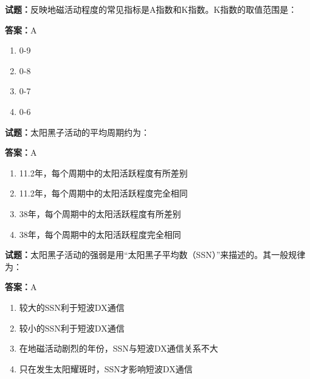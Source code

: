 \documentclass{ctexbook}
\begin{document}




\vspace{1em}

\textbf{试题：}反映地磁活动程度的常见指标是A指数和K指数。K指数的取值范围是： 

\textbf{答案：}A 

\begin{enumerate}[leftmargin=3em]
  \item 0-9 

  \item 0-8 

  \item 0-7 

  \item 0-6 

\end{enumerate}





\vspace{1em}

\textbf{试题：}太阳黑子活动的平均周期约为： 

\textbf{答案：}A 

\begin{enumerate}[leftmargin=3em]
  \item 11.2年，每个周期中的太阳活跃程度有所差别 

  \item 11.2年，每个周期中的太阳活跃程度完全相同 

  \item 38年，每个周期中的太阳活跃程度有所差别 

  \item 38年，每个周期中的太阳活跃程度完全相同 

\end{enumerate}






\vspace{1em}

\textbf{试题：}太阳黑子活动的强弱是用“太阳黑子平均数（SSN）”来描述的。其一般规律为： 

\textbf{答案：}A 

\begin{enumerate}[leftmargin=3em]
  \item 较大的SSN利于短波DX通信 

  \item 较小的SSN利于短波DX通信 

  \item 在地磁活动剧烈的年份，SSN与短波DX通信关系不大 

  \item 只在发生太阳耀斑时，SSN才影响短波DX通信 

\end{enumerate}
\end{document}
